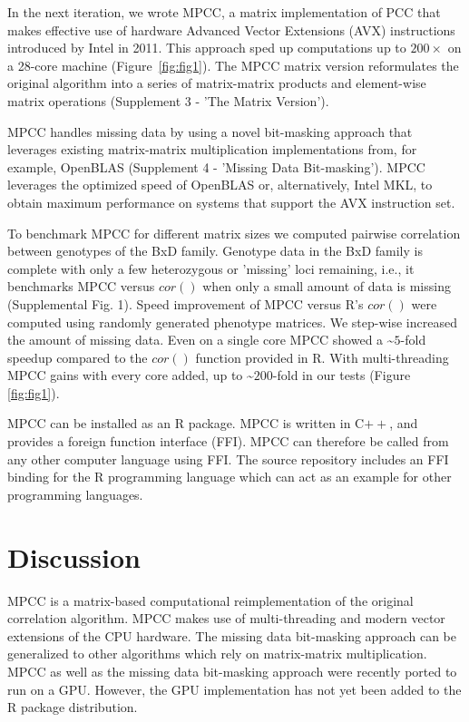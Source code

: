 \documentclass{bioinfo}
\begin{document}
In the next iteration, we wrote MPCC, a matrix implementation of PCC that makes effective
use of hardware Advanced Vector Extensions (AVX) instructions
introduced by Intel in 2011. This approach sped up computations up to
$200\times$ on a 28-core machine (Figure~\ref{fig:fig1}). The MPCC
matrix version reformulates the original algorithm into a series of
matrix-matrix products and element-wise matrix operations (Supplement 3 - 
'The Matrix Version'). 

MPCC handles missing data by using a novel bit-masking approach that
leverages existing matrix-matrix multiplication implementations from,
for example, OpenBLAS (Supplement 4 - 'Missing Data Bit-masking').
MPCC leverages the optimized speed of OpenBLAS or, alternatively,
Intel\textregistered{} MKL, to obtain maximum performance on systems
that support the AVX instruction set.

To benchmark MPCC for different matrix sizes we computed pairwise
correlation between genotypes of the BxD family. Genotype data in the
BxD family is complete with only a few heterozygous or 'missing' loci
remaining, i.e., it benchmarks MPCC versus $cor()$ when only a small amount
of data is missing (Supplemental Fig. 1). Speed improvement of MPCC
versus R's $cor()$ were computed using randomly generated phenotype matrices. 
We step-wise increased the amount of missing data. Even on a single core 
MPCC showed a \textasciitilde{}$5$-fold speedup compared to the $cor()$
function provided in R. With multi-threading MPCC gains with every 
core added, up to \textasciitilde{}$200$-fold in our tests (Figure \ref{fig:fig1}).

MPCC can be installed as an R package. MPCC is written in C$++$, and
provides a foreign function interface (FFI). MPCC can therefore be
called from any other computer language using FFI. The source
repository includes an FFI binding for the R programming language
which can act as an example for other programming languages.

\vspace*{2mm}
\section{Discussion}

MPCC is a matrix-based computational reimplementation of the original
correlation algorithm. MPCC makes use of multi-threading and modern
vector extensions of the CPU hardware.  The missing data bit-masking
approach can be generalized to other algorithms which rely on
matrix-matrix multiplication. MPCC as well as the missing data 
bit-masking approach were recently ported to run on a GPU. However, 
the GPU implementation has not yet been added to the R package distribution.
\end{document}
